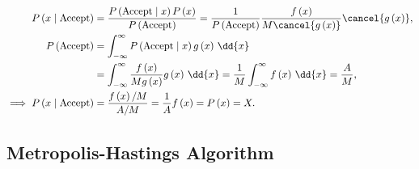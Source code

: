 \begin{subequations}\label{eq:stats:sampling_prob_dist:reject:proof}
\begin{align}
P\left(x \mid \text{Accept}\right) &= \frac{P\left(\text{Accept} \mid x\right) P\left(x\right)}{P\left(\text{Accept}\right)} = \frac{1}{P\left(\text{Accept}\right)} \frac{f\left(x\right)}{M \cancel{g\left(x\right)}} \cancel{g\left(x\right)}, \label{eq:stats:sampling_prob_dist:reject:proof:x_given_Accept} \\
P\left(\text{Accept}\right) &= \int_{-\infty}^{\infty} P\left(\text{Accept} \mid x\right) g\left(x\right) \, \dd{x} \label{eq:stats:sampling_prob_dist:reject:proof:P_Accept1} \\
&= \int_{-\infty}^{\infty} \frac{f\left(x\right)}{M g\left(x\right)} g\left(x\right) \, \dd{x} = \frac{1}{M} \int_{-\infty}^{\infty} f\left(x\right) \, \dd{x} = \frac{A}{M}, \label{eq:stats:sampling_prob_dist:reject:proof:P_Accept2} \\
\implies P\left(x \mid \text{Accept}\right) &= \frac{f\left(x\right)/M}{A/M} = \frac{1}{A} f\left(x\right) = P\left(x\right) = X. \label{eq:stats:sampling_prob_dist:reject:proof:conclusion}
\end{align}
\end{subequations}

\subsection{Metropolis-Hastings Algorithm}
\label{misc:sampling_prob_dist:metropolis_hastings}
